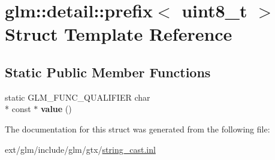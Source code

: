 \hypertarget{structglm_1_1detail_1_1prefix_3_01uint8__t_01_4}{\section{glm\-:\-:detail\-:\-:prefix$<$ uint8\-\_\-t $>$ Struct Template Reference}
\label{structglm_1_1detail_1_1prefix_3_01uint8__t_01_4}
}
\subsection*{Static Public Member Functions}
\begin{DoxyCompactItemize}
\item 
\hypertarget{structglm_1_1detail_1_1prefix_3_01uint8__t_01_4_a890818b4dedbe09730336c1ae3913339}{static G\-L\-M\-\_\-\-F\-U\-N\-C\-\_\-\-Q\-U\-A\-L\-I\-F\-I\-E\-R char \\*
const $\ast$ {\bfseries value} ()}\label{structglm_1_1detail_1_1prefix_3_01uint8__t_01_4_a890818b4dedbe09730336c1ae3913339}

\end{DoxyCompactItemize}


The documentation for this struct was generated from the following file\-:\begin{DoxyCompactItemize}
\item 
ext/glm/include/glm/gtx/\hyperlink{string__cast_8inl}{string\-\_\-cast.\-inl}\end{DoxyCompactItemize}

